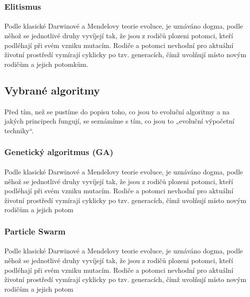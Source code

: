 \documentclass[bc,male,java,dept460]{diploma}		%
\begin{document}
\subsubsection{Elitismus}
\paragraph*{}
Podle klasické Darwinové a Mendelovy teorie evoluce, je uznáváno dogma, podle něhož se jednotlivé druhy vyvíjejí tak, že jsou z rodičů
plozeni potomci, kteří podléhají při svém vzniku mutacím. Rodiče a potomci nevhodní pro aktuální životní prostředí vymírají cyklicky po tzv. generacích, čímž uvolňují místo novým rodičům a jejich potomkům.

\subsection{Vybrané algoritmy}
\paragraph*{}
Před tím, než se pustíme do popisu toho, co jsou to evoluční algoritmy a na jakých principech fungují, se seznámíme s tím, co jsou to „evoluční výpočetní techniky“.

\subsubsection{Genetický algoritmus (GA)}
\paragraph*{}
Podle klasické Darwinové a Mendelovy teorie evoluce, je uznáváno dogma, podle něhož se jednotlivé druhy vyvíjejí tak, že jsou z rodičů plozeni potomci, kteří podléhají při svém vzniku mutacím. Rodiče a potomci nevhodní pro aktuální životní prostředí vymírají cyklicky po tzv. generacích, čímž uvolňují místo novým rodičům a jejich potom

\subsubsection{Particle Swarm}
\paragraph*{}
Podle klasické Darwinové a Mendelovy teorie evoluce, je uznáváno dogma, podle něhož se jednotlivé druhy vyvíjejí tak, že jsou z rodičů plozeni potomci, kteří podléhají při svém vzniku mutacím. Rodiče a potomci nevhodní pro aktuální životní prostředí vymírají cyklicky po tzv. generacích, čímž uvolňují místo novým rodičům a jejich potom
\end{document}
